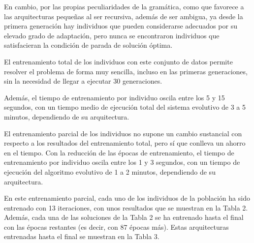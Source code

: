 \documentclass[spanish,a4paper,12pt,twoside]{report}
\begin{document}
  En cambio, por las propias peculiaridades de la gramática, como que favorece a las arquitecturas pequeñas al ser recursiva, además de ser ambigua, ya desde la primera generación hay individuos que pueden considerarse adecuados por su elevado grado de adaptación, pero nunca se encontraron individuos que satisfacieran la condición de parada de solución óptima. \par
  El entrenamiento total de los individuos con este conjunto de datos permite resolver el problema de forma muy sencilla, incluso en las primeras generaciones, sin la necesidad de llegar a ejecutar 30 generaciones. \par
  Además, el tiempo de entrenamiento por individuo oscila entre los 5 y 15 segundos, con un tiempo medio de ejecución total del sistema evolutivo de 3 a 5 minutos, dependiendo de su arquitectura. \par
  El entrenamiento parcial de los individuos no supone un cambio sustancial con respecto a los resultados del entrenamiento total, pero sí que conlleva un ahorro en el tiempo. Con la reducción de las épocas de entrenamiento, el tiempo de entrenamiento por individuo oscila entre los 1 y 3 segundos, con un tiempo de ejecución del algoritmo evolutivo de 1 a 2 minutos, dependiendo de su arquitectura. \par
  En este entrenamiento parcial, cada uno de los individuos de la población ha sido entrenado con 13 iteraciones, con unos resultados que se muestran en la Tabla 2. Además, cada una de las soluciones de la Tabla 2 se ha entrenado hasta el final con las épocas restantes (es decir, con 87 épocas más). Estas arquitecturas entrenadas hasta el final se muestran en la Tabla 3. \par
\end{document}
